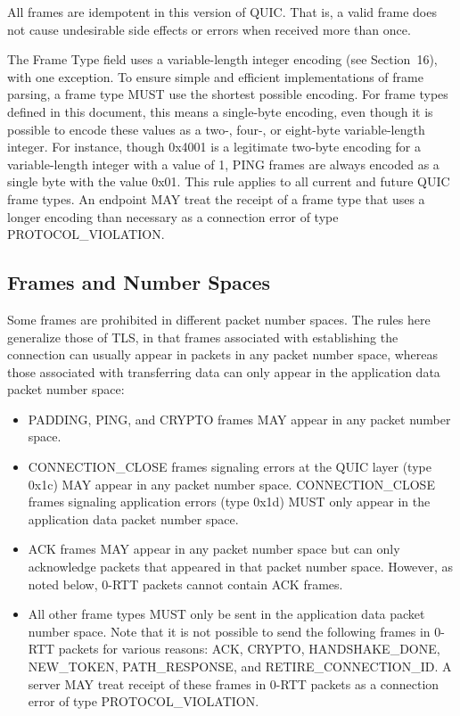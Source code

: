 \documentclass{article}
\begin{document}
All frames are idempotent in this version of QUIC.  That is, a valid frame does not cause undesirable side effects or errors when received more than once.

The Frame Type field uses a variable-length integer encoding (see Section~16), with one exception.  To ensure simple and efficient implementations of frame parsing, a frame type MUST use the shortest possible encoding.  For frame types defined in this document, this means a single-byte encoding, even though it is possible to encode these values as a two-, four-, or eight-byte variable-length integer. For instance, though 0x4001 is a legitimate two-byte encoding for a variable-length integer with a value of 1, PING frames are always encoded as a single byte with the value 0x01.  This rule applies to all current and future QUIC frame types.  An endpoint MAY treat the receipt of a frame type that uses a longer encoding than necessary as a connection error of type PROTOCOL\_VIOLATION.

\subsection{Frames and Number Spaces}

Some frames are prohibited in different packet number spaces.  The rules here generalize those of TLS, in that frames associated with establishing the connection can usually appear in packets in any packet number space, whereas those associated with transferring data can only appear in the application data packet number space:

\begin{itemize}
\item PADDING, PING, and CRYPTO frames MAY appear in any packet number space.
\item CONNECTION\_CLOSE frames signaling errors at the QUIC layer (type 0x1c) MAY appear in any packet number space.  CONNECTION\_CLOSE frames signaling application errors (type 0x1d) MUST only appear in the application data packet number space.
\item ACK frames MAY appear in any packet number space but can only acknowledge packets that appeared in that packet number space. However, as noted below, 0-RTT packets cannot contain ACK frames.
\item All other frame types MUST only be sent in the application data packet number space.
Note that it is not possible to send the following frames in 0-RTT packets for various reasons: ACK, CRYPTO, HANDSHAKE\_DONE, NEW\_TOKEN, PATH\_RESPONSE, and RETIRE\_CONNECTION\_ID.  A server MAY treat receipt of these frames in 0-RTT packets as a connection error of type PROTOCOL\_VIOLATION.

\end{itemize}
\end{document}
